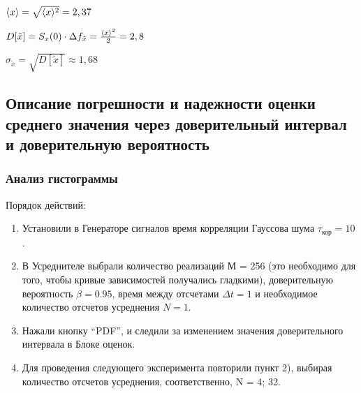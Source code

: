 \documentclass[a4paper,14pt]{extarticle}
\begin{document}
$\langle x\rangle =  \sqrt{\langle x\rangle^2} = 2,37$

$D[\tilde{x}] = S_x(0)\cdot \Delta f_{\tilde{x}} =\frac{\langle x\rangle^2}{2} = 2,8$

$\sigma_{\tilde{x}} = \sqrt{D[\tilde{x}]}\approx 1,68$

\subsection[Задание 6]{Описание погрешности и надежности оценки среднего значения через доверительный интервал и доверительную вероятность}
\subsubsection[Задание 6.1]{Анализ гистограммы}
Порядок действий:
\begin{enumerate}
	\item Установили в Генераторе сигналов время корреляции Гауссова шума $\tau_\text{кор}=10$.
	\item В Усреднителе выбрали количество реализаций М = 256 (это необходимо для того, чтобы кривые зависимостей получались гладкими), доверительную вероятность $\beta = 0.95$, время между отсчетами $\Delta t = 1$ и необходимое количество отсчетов усреднения $N=1$.
	\item Нажали кнопку “PDF”, и следили за изменением значения доверительного интервала в Блоке оценок.
	\item Для проведения следующего эксперимента повторили пункт 2), выбирая количество отсчетов усреднения, соответственно, N = 4; 32.
\end{enumerate}
\end{document}
